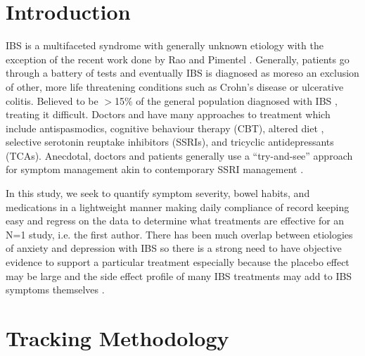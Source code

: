 \documentclass[conference]{IEEEtran}
\begin{document}



%
\IEEEpeerreviewmaketitle



\section{Introduction}
IBS is a multifaceted syndrome with generally unknown etiology with the exception of the recent work done by Rao \cite{erdogan2015small} and Pimentel \cite{pimentel2000eradication}.  Generally, patients go through a battery of tests and eventually IBS is diagnosed as moreso an exclusion of other, more life threatening conditions such as Crohn's disease or ulcerative colitis.   Believed to be $>$15\% of the general population diagnosed with IBS \cite{drossman1982bowel}, treating it difficult.  Doctors and have many approaches to treatment which include antispasmodics, cognitive behaviour therapy (CBT), altered diet \cite{gibson2010evidence}, selective serotonin reuptake inhibitors (SSRIs), and tricyclic antidepressants (TCAs). Anecdotal, doctors and patients generally use a “try-and-see” approach for symptom management akin to contemporary SSRI management \cite{trivedi2006evaluation}.

In this study, we seek to quantify symptom severity, bowel habits, and medications in a lightweight manner making daily compliance of record keeping easy and regress on the data to determine what treatments are effective for an N=1 study, i.e. the first author.  There has been much overlap between etiologies of anxiety and depression with IBS so there is a strong need to have objective evidence to support a particular treatment especially because the placebo effect \cite{kaptchuk2008components} may be large and the side effect profile of many IBS treatments may add to IBS symptoms themselves \cite{vanderhoff2002proton}.

\section{Tracking Methodology}
\end{document}
